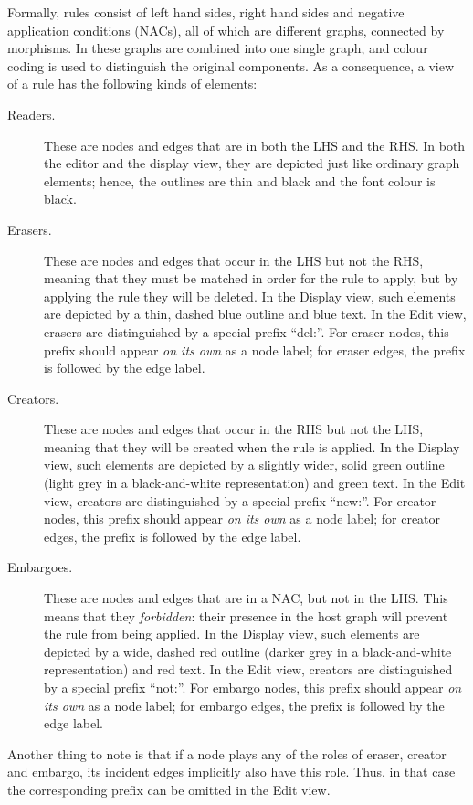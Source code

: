 Formally, rules consist of left hand sides, right hand sides and negative
application conditions (NACs), all of which are different graphs, connected by
morphisms. In \Groove{} these graphs are combined into one single graph, and
colour coding is used to distinguish the original components. As a consequence,
a \Groove{} view of a rule has the following kinds of elements:

\begin{description}
\item[Readers.] These are nodes and edges that are in both the LHS and the RHS.
  In both the editor and the display view, they are depicted just like ordinary
  graph elements; hence, the outlines are thin and black and the font colour is
  black.

\item[Erasers.] These are nodes and edges that occur in the LHS but not the
  RHS, meaning that they must be matched in order for the rule to apply, but by
  applying the rule they will be deleted. In the Display view, such elements
  are depicted by a thin, dashed blue outline and blue text. In the Edit view,
  erasers are distinguished by a special prefix ``\textsf{del:}''. For eraser
  nodes, this prefix should appear \emph{on its own} as a node label; for
  eraser edges, the prefix is followed by the edge label.

\item[Creators.] These are nodes and edges that occur in the RHS but not the
  LHS, meaning that they will be created when the rule is applied. In the
  Display view, such elements are depicted by a slightly wider, solid green
  outline (light grey in a black-and-white representation) and green text. In
  the Edit view, creators are distinguished by a special prefix
  ``\textsf{new:}''. For creator nodes, this prefix should appear \emph{on its
  own} as a node label; for creator edges, the prefix is followed by the edge
  label.

\item[Embargoes.] These are nodes and edges that are in a NAC, but not in the
  LHS. This means that they \emph{forbidden}: their presence in the host graph
  will prevent the rule from being applied. In the Display view, such elements
  are depicted by a wide, dashed red outline (darker grey in a black-and-white
  representation) and red text. In the Edit view, creators are distinguished by
  a special prefix ``\textsf{not:}''. For embargo nodes, this prefix should
  appear \emph{on its own} as a node label; for embargo edges, the prefix is
  followed by the edge label.
\end{description}
%
Another thing to note is that if a node plays any of the roles of eraser,
creator and embargo, its incident edges implicitly also have this role. Thus,
in that case the corresponding prefix can be omitted in the Edit view.

